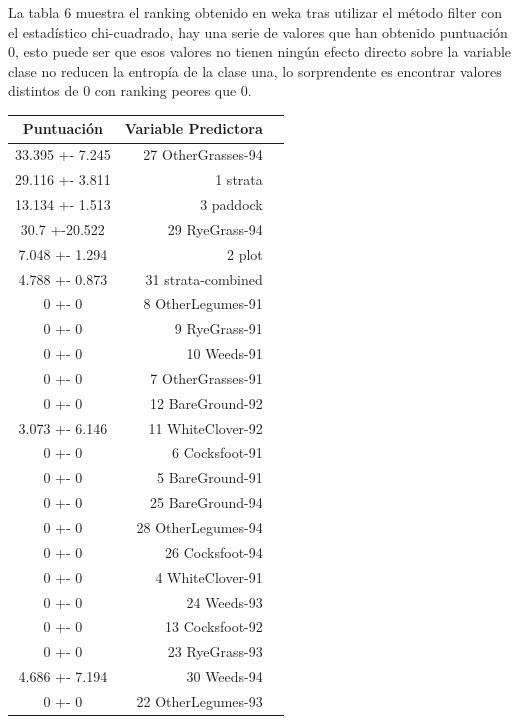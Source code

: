 \documentclass[es]{ifirak}
\begin{document}
La tabla 6 muestra el ranking obtenido en weka tras utilizar el método filter con el estadístico chi-cuadrado, hay una serie de valores que han obtenido puntuación 0, esto puede ser que esos valores no tienen ningún efecto directo sobre la variable clase no reducen la entropía de la clase una, lo sorprendente es encontrar valores distintos de 0 con ranking peores que 0.\\
\pagebreak
\begin{table}[htbp]
	\centering
	\begin{tabular}{|c|rl|}
		  Puntuación    & Variable Predictora &  \\ \hline
		33.395 +- 7.245 &  27 OtherGrasses-94 &  \\
		29.116 +- 3.811 &            1 strata &  \\
		13.134 +- 1.513 &           3 paddock &  \\
		30.7   +-20.522 &      29 RyeGrass-94 &  \\
		7.048 +- 1.294  &              2 plot &  \\
		4.788 +- 0.873  &  31 strata-combined &  \\
		  0     +- 0    &   8 OtherLegumes-91 &  \\
		  0     +- 0    &       9 RyeGrass-91 &  \\
		  0     +- 0    &         10 Weeds-91 &  \\
		  0     +- 0    &   7 OtherGrasses-91 &  \\
		  0     +- 0    &    12 BareGround-92 &  \\
		3.073 +- 6.146  &   11 WhiteClover-92 &  \\
		  0     +- 0    &      6 Cocksfoot-91 &  \\
		  0     +- 0    &     5 BareGround-91 &  \\
		  0     +- 0    &    25 BareGround-94 &  \\
		  0     +- 0    &  28 OtherLegumes-94 &  \\
		  0     +- 0    &     26 Cocksfoot-94 &  \\
		  0     +- 0    &    4 WhiteClover-91 &  \\
		  0     +- 0    &         24 Weeds-93 &  \\
		  0     +- 0    &     13 Cocksfoot-92 &  \\
		  0     +- 0    &      23 RyeGrass-93 &  \\
		4.686 +- 7.194  &         30 Weeds-94 &  \\
		  0     +- 0    &  22 OtherLegumes-93 &  \\

\end{tabular}
\end{table}
\end{document}
